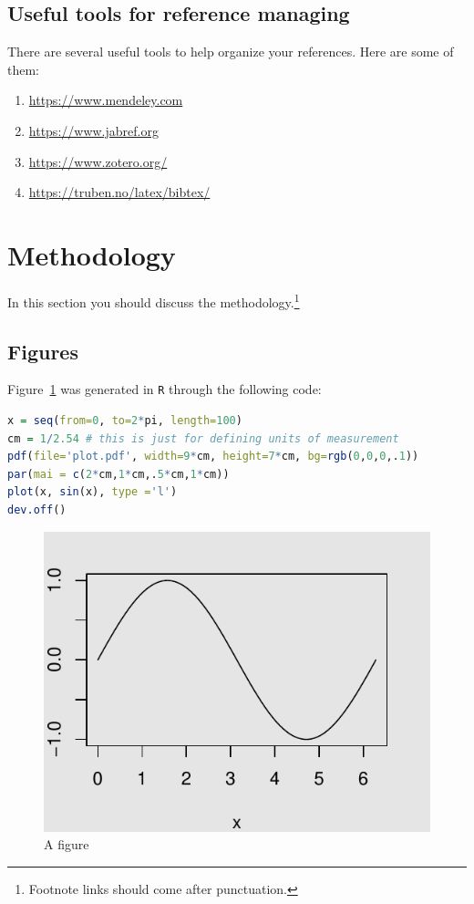 \documentclass[fleqn]{rbfin}
\begin{document}
\subsection{Useful tools for reference managing}
There are several useful tools to help organize your references. Here are some of them:
\begin{enumerate}[label=(\roman*), noitemsep]
\item \url{https://www.mendeley.com}
\item \url{https://www.jabref.org}
\item \url{https://www.zotero.org/}
\item \url{https://truben.no/latex/bibtex/}
\end{enumerate}

\section{Methodology}
In this section you should discuss the methodology.\footnote{Footnote links should come after punctuation.}

\subsection{Figures}
Figure~\ref{fig1} was generated in \lstinline/R/ through the following code:
\begin{lstlisting}[language=R]
x = seq(from=0, to=2*pi, length=100)
cm = 1/2.54 # this is just for defining units of measurement
pdf(file='plot.pdf', width=9*cm, height=7*cm, bg=rgb(0,0,0,.1))
par(mai = c(2*cm,1*cm,.5*cm,1*cm))
plot(x, sin(x), type ='l')
dev.off()
\end{lstlisting}

\begin{figure}[ht]
\begin{center}
\caption{A figure}\label{fig1}
\includegraphics{media/plot.pdf}
\end{center}
\end{figure}
\end{document}
